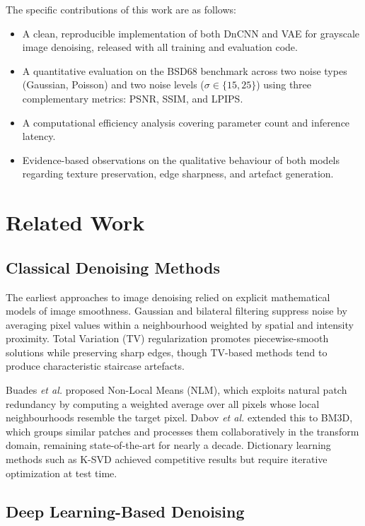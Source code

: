 \documentclass[conference]{IEEEtran}
\begin{document}
The specific contributions of this work are as follows:
\begin{itemize}
  \item A clean, reproducible implementation of both DnCNN and VAE for
    grayscale image denoising, released with all training and evaluation
    code.
  \item A quantitative evaluation on the BSD68 benchmark across two
    noise types (Gaussian, Poisson) and two noise levels
    (\(\sigma \in \{15, 25\}\)) using three complementary metrics: PSNR,
    SSIM, and LPIPS.
  \item A computational efficiency analysis covering parameter count and
    inference latency.
  \item Evidence-based observations on the qualitative behaviour of both
    models regarding texture preservation, edge sharpness, and artefact
    generation.
\end{itemize}

\section{Related Work}

\subsection{Classical Denoising Methods}

The earliest approaches to image denoising relied on explicit
mathematical models of image smoothness. Gaussian and bilateral filtering
suppress noise by averaging pixel values within a neighbourhood weighted
by spatial and intensity proximity. Total Variation (TV) regularization
promotes piecewise-smooth solutions while preserving sharp edges, though
TV-based methods tend to produce characteristic staircase artefacts.

Buades \textit{et al.} proposed Non-Local Means (NLM), which exploits
natural patch redundancy by computing a weighted average over all pixels
whose local neighbourhoods resemble the target pixel. Dabov \textit{et al.}
extended this to BM3D, which groups similar patches and processes them
collaboratively in the transform domain, remaining state-of-the-art for
nearly a decade. Dictionary learning methods such as K-SVD achieved
competitive results but require iterative optimization at test time.

\subsection{Deep Learning-Based Denoising}
\end{document}
